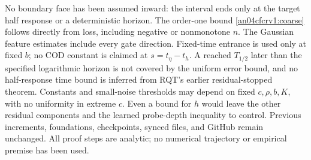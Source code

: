 \documentclass[11pt]{article}
\begin{document}
No boundary face has been assumed inward: the interval ends only
at the target half response or a deterministic horizon. The
order-one bound \eqref{an04cfcrv1:coarse} follows directly from
loss, including negative or nonmonotone $n$. The Gaussian feature
estimates include every gate direction. Fixed-time entrance is
used only at fixed $b$; no COD constant is claimed at
$s=t_\eta-t_h$. A reached $T_{1/2}$ later than the specified
logarithmic horizon is not covered by the uniform error bound,
and no half-response time bound is inferred from RQT's earlier
residual-stopped theorem. Constants and small-noise thresholds may
depend on fixed $c,\rho,b,K$, with no uniformity in extreme $c$.
Even a bound for $h$ would leave the other residual components and
the learned probe-depth inequality to control. Previous increments,
foundations, checkpoints, synced files, and GitHub remain unchanged.
All proof steps are analytic; no numerical trajectory or empirical
premise has been used.
\end{document}
